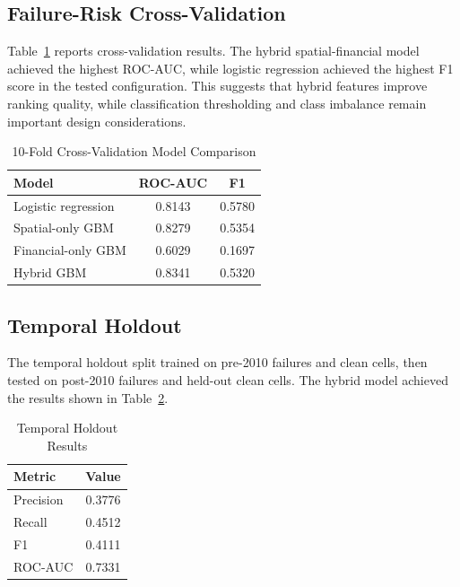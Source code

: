 \documentclass[conference]{IEEEtran}
\begin{document}
\subsection{Failure-Risk Cross-Validation}
Table~\ref{tab:model_comparison} reports cross-validation results. The
hybrid spatial-financial model achieved the highest ROC-AUC, while logistic
regression achieved the highest F1 score in the tested configuration. This
suggests that hybrid features improve ranking quality, while classification
thresholding and class imbalance remain important design considerations.

\begin{table}[htbp]
\caption{10-Fold Cross-Validation Model Comparison}
\begin{center}
\begin{tabular}{lcc}
\toprule
\textbf{Model} & \textbf{ROC-AUC} & \textbf{F1}\\
\midrule
Logistic regression & 0.8143 & 0.5780\\
Spatial-only GBM & 0.8279 & 0.5354\\
Financial-only GBM & 0.6029 & 0.1697\\
Hybrid GBM & 0.8341 & 0.5320\\
\bottomrule
\end{tabular}
\label{tab:model_comparison}
\end{center}
\end{table}

\subsection{Temporal Holdout}
The temporal holdout split trained on pre-2010 failures and clean cells,
then tested on post-2010 failures and held-out clean cells. The hybrid model
achieved the results shown in Table~\ref{tab:temporal}.

\begin{table}[htbp]
\caption{Temporal Holdout Results}
\begin{center}
\begin{tabular}{lc}
\toprule
\textbf{Metric} & \textbf{Value}\\
\midrule
Precision & 0.3776\\
Recall & 0.4512\\
F1 & 0.4111\\
ROC-AUC & 0.7331\\
\bottomrule
\end{tabular}
\label{tab:temporal}
\end{center}
\end{table}
\end{document}
